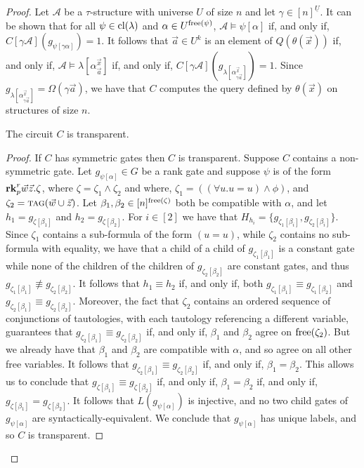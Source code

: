 \documentclass[../paper.tex]{subfiles}
\begin{document}
\begin{proof}
Let $\mathcal{A}$ be a $\tau$-structure with universe $U$ of size $n$ and let
$\gamma \in [n]^{\underline{U}}$. It can be shown that for all $\psi \in
\mathrm{cl}(\lambda)$ and $\alpha \in U^{\mathrm{free}(\psi)}$, $\mathcal{A} \models
\psi[\alpha]$ if, and only if, $C[\gamma \mathcal{A}](g_{\psi[\gamma\alpha]}) =
1$. It follows that $\vec{a} \in U^k$ is an element of $Q(\theta(\vec{x}))$ if,
and only if, $\mathcal{A} \models \lambda[\alpha^{\vec{x}}_{\vec{a}}]$ if, and
only if, $C[\gamma \mathcal{A}](g_{\lambda[\alpha^{\vec{x}}_{\gamma \vec{a}}]})
= 1$. Since $g_{\lambda [\alpha^{\vec{x}}_{\gamma \vec{a}}]} = \Omega (\gamma
\vec{a})$, we have that $C$ computes the query defined by $\theta(\vec{x})$ on
structures of size $n$.

\begin{claim}
  The circuit $C$ is transparent.
\end{claim}
\begin{proof}
  If $C$ has symmetric gates then $C$ is transparent. Suppose $C$ contains a
  non-symmetric gate. Let $g_{\psi[\alpha]}\in G$ be a rank gate and suppose
  $\psi$ is of the form $\text{\textbf{rk}}^r_p \vec{w} \vec{z}. \zeta$, where $\zeta =
  \zeta_1 \land \zeta_2$ and where, $\zeta_1 = ((\forall u. u = u) \land \phi)$,
  and $\zeta_2 = {\normalfont\textsc{tag}}(\vec{w} \cup \vec{z})$. Let $\beta_1 , \beta_2 \in
  [n]^{\mathrm{free}(\zeta)}$ both be compatible with $\alpha$, and let $h_1 =
  g_{\zeta[\beta_1]}$ and $h_2 = g_{\zeta[\beta_2]}$. For $i \in [2]$ we have
  that $H_{h_i} = \{g_{\zeta_1[\beta_i]}, g_{\zeta_2[\beta_i]}\}$. Since
  $\zeta_1$ contains a sub-formula of the form $(u = u)$, while $\zeta_2$
  contains no sub-formula with equality, we have that a child of a child of
  $g_{\zeta_1[\beta_1]}$ is a constant gate while none of the children of the
  children of $g_{\zeta_2[\beta_2]}$ are constant gates, and thus $g_{\zeta_1
    [\beta_1]} \not\equiv g_{\zeta_2[\beta_2]}$. It follows that $h_1 \equiv
  h_2$ if, and only if, both $g_{\zeta_1 [\beta_1]} \equiv g_{\zeta_1
    [\beta_2]}$ and $g_{\zeta_2[\beta_1]} \equiv g_{\zeta_2[\beta_2]}$.
  Moreover, the fact that $\zeta_2$ contains an ordered sequence of conjunctions
  of tautologies, with each tautology referencing a different variable,
  guarantees that $g_{\zeta_2[\beta_1]} \equiv g_{\zeta_2[\beta_2]}$ if, and
  only if, $\beta_1$ and $\beta_2$ agree on $\mathrm{free}(\zeta_2)$. But we already
  have that $\beta_1$ and $\beta_2$ are compatible with $\alpha$, and so agree
  on all other free variables. It follows that $g_{\zeta_2[\beta_1]} \equiv
  g_{\zeta_2[\beta_2]}$ if, and only if, $\beta_1 = \beta_2$. This allows us to
  conclude that $g_{\zeta[\beta_1]} \equiv g_{\zeta[\beta_2]}$ if, and only if,
  $\beta_1 = \beta_2$ if, and only if, $g_{\zeta[\beta_1]} =
  g_{\zeta[\beta_2]}$. It follows that $L(g_{\psi[\alpha]})$ is injective, and
  no two child gates of $g_{\psi[\alpha]}$ are syntactically-equivalent. We
  conclude that $g_{\psi[\alpha]}$ has unique labels, and so $C$ is transparent.
\end{proof}


\end{proof}
\end{document}
